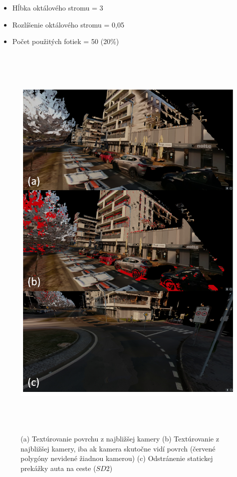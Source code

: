 \begin{itemize}
  \setlength\itemsep{0.2em}
  \item Hĺbka oktálového stromu = 3
  \item Rozlíšenie oktálového stromu = 0,05
  \item Počet použitých fotiek = 50 (20\%)
\end{itemize}

\vfill
\begin{figure}[!htbp]
  \centering
  \includegraphics[width=16cm, height=20cm]{img/texturing_process.png}
  \caption{(a) Textúrovanie povrchu z najbližšej kamery (b) Textúrovanie z najbližšej kamery, iba ak kamera skutočne vidí povrch (červené polygóny nevidené žiadnou kamerou) (c) Odstránenie statickej prekážky auta na ceste ($SD2$)} 
  \label{fig:texture_process}
\end{figure}
\vfill\clearpage 


